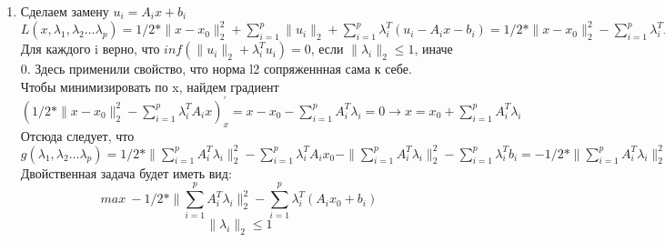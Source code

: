 \documentclass[12pt]{extreport}
\theoremstyle{definiton}
\theoremstyle{definition}
\theoremstyle{definition}
\let\leq\leqslant
\def\prend{
	\medskip
}
\begin{document}
\begin{enumerate}
\begin{enumerate}
    \end{enumerate}
    \item Сделаем замену $u_i = A_ix+b_i$
    \\ $L(x, \lambda_1,\lambda_2 \ldots \lambda_p) = 1/2 * \|x-x_0\|_2^2 + \sum_{i=1}^p\|u_i\|_2 + \sum_{i=1}^p\lambda_i^T(u_i - A_ix - b_i) = 1/2 * \|x-x_0\|_2^2 - \sum_{i=1}^p\lambda_i^TA_ix + \sum_{i=1}^p(\|u_i\|_2+\lambda_i^Tu_i) - \sum_{i=1}^p\lambda_i^Tb_i$
    \\ Для каждого i верно, что $inf(\|u_i\|_2+\lambda_i^Tu_i) = 0$, если $\|\lambda_i\|_2 \leq 1$, иначе 0. Здесь применили свойство, что норма l2 сопряженнная сама к себе.
    \\ Чтобы минимизировать по x, найдем градиент $(1/2 * \|x-x_0\|_2^2 - \sum_{i=1}^p\lambda_i^TA_ix)_x^{'}=x - x_0 - \sum_{i=1}^p A_i^T\lambda_i = 0 \to x = x_0 + \sum_{i=1}^p A_i^T\lambda_i$
    \\ Отсюда следует, что $g(\lambda_1,\lambda_2 \ldots \lambda_p) = 1/2*\|\sum_{i=1}^p A_i^T\lambda_i\|_2^2 - \sum_{i=1}^p\lambda_i^TA_ix_0 - \|\sum_{i=1}^p A_i^T\lambda_i\|_2^2 - \sum_{i=1}^p\lambda_i^Tb_i = -1/2*\|\sum_{i=1}^p A_i^T\lambda_i\|_2^2 - \sum_{i=1}^p\lambda_i^T(A_ix_0+b_i)$
    \\ Двойственная задача будет иметь вид: 
    $$max\ -1/2*\|\sum_{i=1}^p A_i^T\lambda_i\|_2^2 - \sum_{i=1}^p\lambda_i^T(A_ix_0+b_i)$$ $$\|\lambda_i\|_2 \leq 1$$
    \end{enumerate}
    \prend
\end{document}
